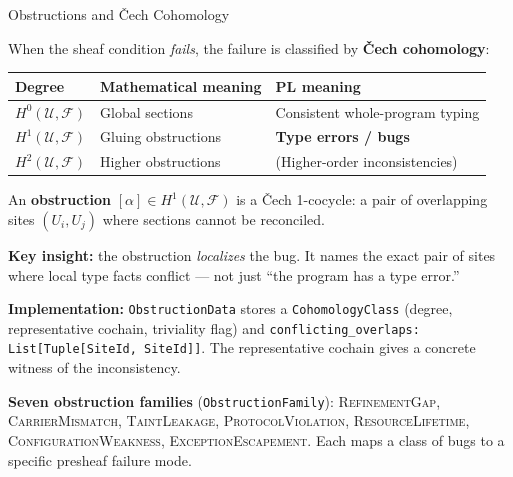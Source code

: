\documentclass[aspectratio=169,11pt]{beamer}
\newcommand{\Sem}{\mathcal{F}}
\begin{document}
\begin{frame}{Obstructions and \v{C}ech Cohomology}

When the sheaf condition \emph{fails}, the failure is classified by
\textbf{\v{C}ech cohomology}:

\vspace{0.3em}
{\small
\begin{tabular}{@{}lll@{}}
\textbf{Degree} & \textbf{Mathematical meaning} & \textbf{PL meaning} \\
\hline
$H^0(\mathcal{U}, \Sem)$ & Global sections & Consistent whole-program typing \\
$H^1(\mathcal{U}, \Sem)$ & Gluing obstructions & \textbf{Type errors / bugs} \\
$H^2(\mathcal{U}, \Sem)$ & Higher obstructions & (Higher-order inconsistencies) \\
\end{tabular}
}

\vspace{0.3em}
An \textbf{obstruction} $[\alpha] \in H^1(\mathcal{U}, \Sem)$ is a
\v{C}ech 1-cocycle: a pair of overlapping sites $(U_i, U_j)$
where sections cannot be reconciled.

\vspace{0.3em}
\textbf{Key insight:} the obstruction \emph{localizes} the bug.
It names the exact pair of sites where local type facts conflict — not
just ``the program has a type error.''

\vspace{0.4em}
{\small
\textbf{Implementation:}
\texttt{ObstructionData} stores a \texttt{CohomologyClass} (degree, representative cochain, triviality flag)
and \texttt{conflicting\_overlaps: List[Tuple[SiteId, SiteId]]}.
The representative cochain gives a concrete witness of the inconsistency.
}

\vspace{0.3em}
{\small
\textbf{Seven obstruction families} (\texttt{ObstructionFamily}):
\textsc{RefinementGap}, \textsc{CarrierMismatch}, \textsc{TaintLeakage},
\textsc{ProtocolViolation}, \textsc{ResourceLifetime},
\textsc{ConfigurationWeakness}, \textsc{ExceptionEscapement}.
Each maps a class of bugs to a specific presheaf failure mode.
}

\end{frame}
\end{document}
